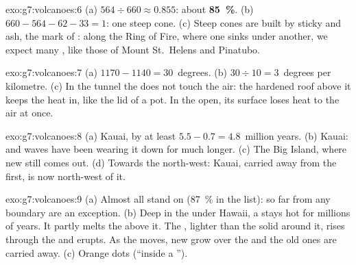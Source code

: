 \begin{solution}{exo:g7:volcanoes:6}
(a) $564 \div 660 \approx 0.855$: about \textbf{85~\%}. (b)
$660 - 564 - 62 - 33 = 1$: one steep cone. (c) Steep cones are built by
sticky  and ash, the mark of : along the Ring of
Fire, where one  sinks under another, we expect many , like those of Mount St.~Helens and Pinatubo.
\end{solution}

\begin{solution}{exo:g7:volcanoes:7}
(a) $1170 - 1140 = 30$~degrees. (b) $30 \div 10 = 3$~degrees per
kilometre. (c) In the tunnel the  does not touch the air: the
hardened roof above it keeps the heat in, like the lid of a pot. In the
open, its surface loses heat to the air at once.
\end{solution}

\begin{solution}{exo:g7:volcanoes:8}
(a) Kauai, by at least $5.5 - 0.7 = 4.8$~million years. (b) Kauai: 
and waves have been wearing it down for much longer. (c) The Big Island,
where new  still comes out. (d) Towards the north-west: Kauai, carried
away from the  first, is now north-west of it.
\end{solution}

\begin{solution}{exo:g7:volcanoes:9}
(a) Almost all  stand on  (87~\% in the list):
 so far from any boundary are an exception. (b) Deep in the
 under Hawaii, a  stays hot for millions of years. It
partly melts the  above it. The , lighter than the solid 
around it, rises through the  and erupts. As the  moves, new
 grow over the  and the old ones are carried away. (c)
Orange dots (``inside a '').
\end{solution}

